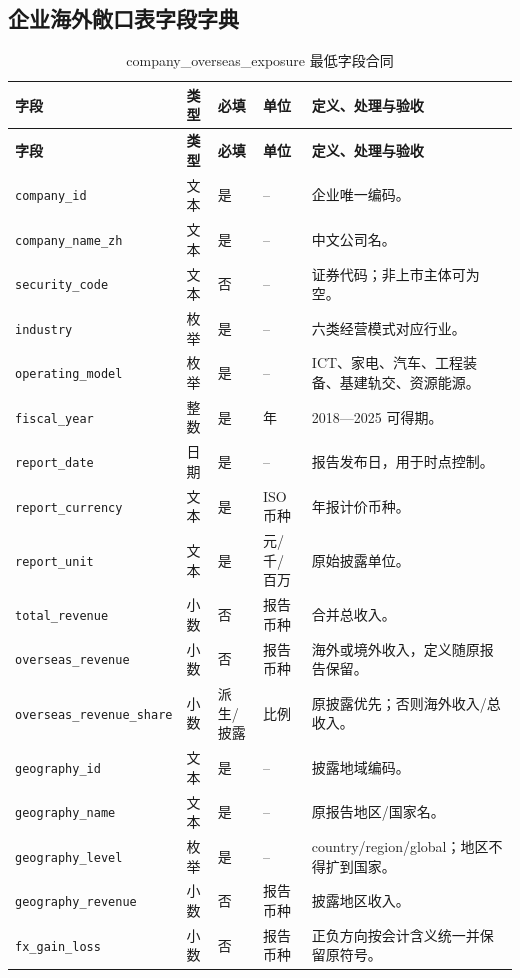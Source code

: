 \documentclass[UTF8,fontset=windows,12pt,openany]{ctexbook}
\newcommand{\Field}[1]{{\small\nolinkurl{#1}}}
\begin{document}
\clearpage
\begin{landscape}
\chapter{企业海外敞口表字段字典}
\begin{longtable}{p{4.2cm}p{2.2cm}p{2.3cm}p{2.7cm}p{7.0cm}}
\caption{company\_overseas\_exposure 最低字段合同}\label{tab:dict-company}\\
\toprule
\textbf{字段} & \textbf{类型} & \textbf{必填} & \textbf{单位} & \textbf{定义、处理与验收}\\
\midrule
\endfirsthead
\toprule \textbf{字段} & \textbf{类型} & \textbf{必填} & \textbf{单位} & \textbf{定义、处理与验收}\\ \midrule
\endhead
\Field{company_id} & 文本 & 是 & -- & 企业唯一编码。\\
\Field{company_name_zh} & 文本 & 是 & -- & 中文公司名。\\
\Field{security_code} & 文本 & 否 & -- & 证券代码；非上市主体可为空。\\
\Field{industry} & 枚举 & 是 & -- & 六类经营模式对应行业。\\
\Field{operating_model} & 枚举 & 是 & -- & ICT、家电、汽车、工程装备、基建轨交、资源能源。\\
\Field{fiscal_year} & 整数 & 是 & 年 & 2018—2025 可得期。\\
\Field{report_date} & 日期 & 是 & -- & 报告发布日，用于时点控制。\\
\Field{report_currency} & 文本 & 是 & ISO 币种 & 年报计价币种。\\
\Field{report_unit} & 文本 & 是 & 元/千/百万 & 原始披露单位。\\
\Field{total_revenue} & 小数 & 否 & 报告币种 & 合并总收入。\\
\Field{overseas_revenue} & 小数 & 否 & 报告币种 & 海外或境外收入，定义随原报告保留。\\
\Field{overseas_revenue_share} & 小数 & 派生/披露 & 比例 & 原披露优先；否则海外收入/总收入。\\
\Field{geography_id} & 文本 & 是 & -- & 披露地域编码。\\
\Field{geography_name} & 文本 & 是 & -- & 原报告地区/国家名。\\
\Field{geography_level} & 枚举 & 是 & -- & country/region/global；地区不得扩到国家。\\
\Field{geography_revenue} & 小数 & 否 & 报告币种 & 披露地区收入。\\
\Field{fx_gain_loss} & 小数 & 否 & 报告币种 & 正负方向按会计含义统一并保留原符号。\\

\end{longtable}
\end{landscape}
\end{document}
